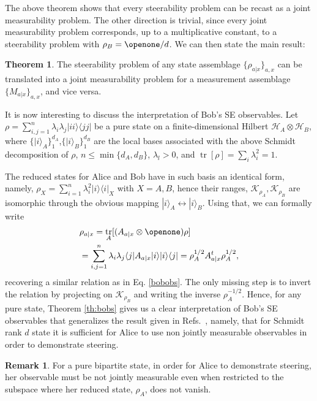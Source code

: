 \documentclass[10pt,twocolumn,aps,prl,nobibnotes,showpacs,superscriptaddress,floatfix]{revtex4-1}
\newcommand{\ket}[1]{| #1 \rangle}
\newcommand{\bra}[1]{\langle #1 |}
\DeclareMathOperator{\tr}{tr}
\theoremstyle{definition}
\newtheorem{theorem}{Theorem}
\newtheorem*{remark*}{Remark}
\begin{document}
The above theorem shows that every steerability problem can be recast as a joint measurability problem. The other direction is trivial, since every joint measurability problem corresponds, up to a multiplicative constant, to a steerability problem with $\rho_B=\openone/d$. We can then state the main result:

\begin{theorem}\label{th:equiv}
The steerability problem of any state assemblage $\{\rho_{a|x}\}_{a,x}$ can be translated into a joint measurability  problem for a measurement assemblage $\{ M_{a|x}\}_{a,x}$, and vice versa.
\end{theorem}
 
It is now interesting to discuss the interpretation of Bob's SE observables.
Let $\rho=\sum_{i,j=1}^n\lambda_i\lambda_j\ket{ii}\bra{jj}$ be a pure state on a finite-dimensional Hilbert $\mathcal{H}_A\otimes \mathcal{H}_B$, where $\{\ket{i}_A\}_{1}^{d_A}$,$\{\ket{i}_B\}_{1}^{d_B}$ are the local bases associated with the above Schmidt decomposition of $\rho$, $n\leq \min\{d_A,d_B\}$, $\lambda_l>0$, and $\tr[\rho]=\sum_i \lambda_i^2=1$.

The reduced states for Alice and Bob have in such basis an identical form, namely, $\rho_{X}=\sum_{i=1}^n \lambda_i^2 \ket{i}\bra{i}_X$ with $X=A,B$, hence their ranges, $\mathcal{K}_{\rho_A},\mathcal{K}_{\rho_B}$ are isomorphic through the obvious mapping $\ket{i}_A\leftrightarrow\ket{i}_B$. 
Using that, we can formally write
\begin{equation}
\label{schmidtn}
\begin{split}
&\rho_{a|x} =\tr_A[(A_{a|x}\otimes \openone)\rho]\\
&=\sum_{i,j=1}^n\lambda_i\lambda_j\bra{j} A_{a|x}\ket{i}
\ket{i}\bra{j}
=\rho_A^{1/2} A_{a|x}^t \rho_A^{1/2},
\end{split}
\end{equation}
recovering a similar relation as in Eq. \eqref{bobobs}. The only missing step is to invert the relation by projecting on $\mathcal{K}_{\rho_B}$ and writing the inverse $\rho_A^{-1/2}$. 
Hence, for any pure state, Theorem \ref{th:bobs} gives us a clear interpretation of Bob's SE observables that generalizes the result given in Refs.~\cite{Uola14,Quint14}, namely, that for Schmidt rank $d$ state it is sufficient for Alice to use non jointly measurable observables in order to demonstrate steering.

\begin{remark*}
For a pure bipartite state, in order for Alice to demonstrate steering, her observable must be not jointly measurable even when restricted to the subspace where her reduced state, $\rho_A$, does not vanish.
\end{remark*}
 
\end{document}
